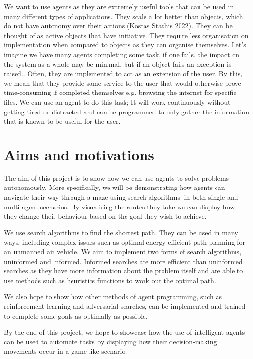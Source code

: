 \documentclass[]{final_report}
\begin{document}
We want to use agents as they are extremely useful tools that can be used in many different types of applications. They scale a lot better than objects, which do not have autonomy over their actions (Kostas Stathis 2022). They can be thought of as active objects that have initiative. They require less organisation on implementation when compared to objects as they can organise themselves. Let's imagine we have many agents completing some task, if one fails, the impact on the system as a whole may be minimal, but if an object fails an exception is raised.\cite{odell2002objects}. Often, they are implemented to act as an extension of the user. By this, we mean that they provide some service to the user that would otherwise prove time-consuming if completed themselves e.g. browsing the internet for specific files. We can use an agent to do this task; It will work continuously without getting tired or distracted and can be programmed to only gather the information that is known to be useful for the user\cite{jennings1996software}.  
 
\section{Aims and motivations}

The aim of this project is to show how we can use agents to solve problems autonomously. More specifically, we will be demonstrating how agents can navigate their way through a maze using search algorithms, in both single and multi-agent scenarios. By visualising the routes they take we can display how they change their behaviour based on the goal they wish to achieve. 

We use search algorithms to find the shortest path. They can be used in many ways, including complex issues such as optimal energy-efficient path planning for an unmanned air vehicle\cite{debnath2019review}. We aim to implement two forms of search algorithms, uninformed and informed. Informed searches are more efficient than uninformed searches as they have more information about the problem itself and are able to use methods such as heuristics functions to work out the optimal path.

We also hope to show how other methods of agent programming, such as reinforcement learning and adversarial searches, can be implemented and trained to complete some goals as optimally as possible.

By the end of this project, we hope to showcase how the use of intelligent agents can be used to automate tasks by displaying how their decision-making movements occur in a game-like scenario. 
\newpage
\end{document}
